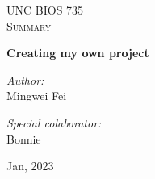 \begin{titlepage}
\vbox{ }

\vbox{ }

\begin{center}
\textsc{\LARGE UNC BIOS 735}\\[1.5cm]
\textsc{\Large Summary}\\[0.5cm]

\vbox{ }

{ \huge \bfseries Creating my own project}\\[0.4cm]

\begin{minipage}{0.4\textwidth}
\begin{flushleft} \large
\emph{Author:}\\
Mingwei Fei
\end{flushleft}
\end{minipage}
\begin{minipage}{0.4\textwidth}
\begin{flushright} \large
\emph{Special colaborator:} \\
Bonnie
\end{flushright}
\end{minipage}
\vfill
{\large Jan, 2023}
\end{center}
\end{titlepage}